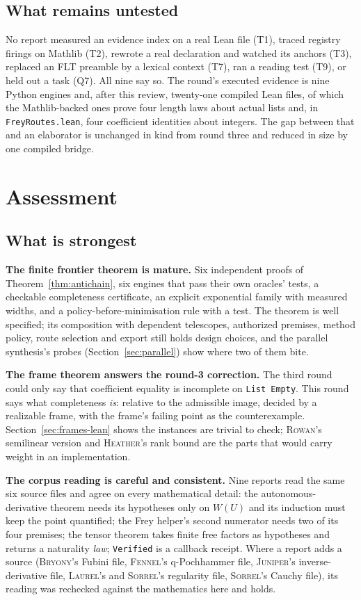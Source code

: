 \documentclass[11pt,a4paper]{article}
\newcommand{\code}[1]{\nolinkurl{#1}}
\newcommand{\Br}{\textsc{Bryony}}
\newcommand{\Fe}{\textsc{Fennel}}
\newcommand{\He}{\textsc{Heather}}
\newcommand{\Ju}{\textsc{Juniper}}
\newcommand{\La}{\textsc{Laurel}}
\newcommand{\Ro}{\textsc{Rowan}}
\newcommand{\So}{\textsc{Sorrel}}
\theoremstyle{definition}
\theoremstyle{plain}
\begin{document}
\subsection{What remains untested}
No report measured an evidence index on a real Lean file (T1), traced registry firings on Mathlib (T2), rewrote a real declaration and watched its anchors (T3), replaced an FLT preamble by a lexical context (T7), ran a reading test (T9), or held out a task (Q7). All nine say so. The round's executed evidence is nine Python engines and, after this review, twenty-one compiled Lean files, of which the Mathlib-backed ones prove four length laws about actual lists and, in \code{FreyRoutes.lean}, four coefficient identities about integers. The gap between that and an elaborator is unchanged in kind from round three and reduced in size by one compiled bridge.

\section{Assessment}\label{sec:assessment}

\subsection{What is strongest}
\textbf{The finite frontier theorem is mature.} Six independent proofs of Theorem~\ref{thm:antichain}, six engines that pass their own oracles' tests, a checkable completeness certificate, an explicit exponential family with measured widths, and a policy-before-minimisation rule with a test. The theorem is well specified; its composition with dependent telescopes, authorized premises, method policy, route selection and export still holds design choices, and the parallel synthesis's probes (Section~\ref{sec:parallel}) show where two of them bite.

\textbf{The frame theorem answers the round-3 correction.} The third round could only say that coefficient equality is incomplete on \code{List Empty}. This round says what completeness \emph{is}: relative to the admissible image, decided by a realizable frame, with the frame's failing point as the counterexample. Section~\ref{sec:frames-lean} shows the instances are trivial to check; \Ro's semilinear version and \He's rank bound are the parts that would carry weight in an implementation.

\textbf{The corpus reading is careful and consistent.} Nine reports read the same six source files and agree on every mathematical detail: the autonomous-derivative theorem needs its hypotheses only on $W(U)$ and its induction must keep the point quantified; the Frey helper's second numerator needs two of its four premises; the tensor theorem takes finite free factors as hypotheses and returns a naturality \emph{law}; \code{Verified} is a callback receipt. Where a report adds a source (\Br's Fubini file, \Fe's q-Pochhammer file, \Ju's inverse-derivative file, \La's and \So's regularity file, \So's Cauchy file), its reading was rechecked against the mathematics here and holds.
\end{document}
